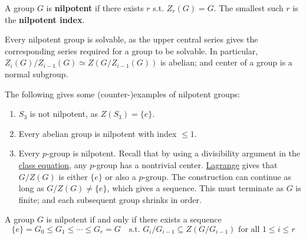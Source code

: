 \documentclass{article}
\begin{document}
\begin{definition}[Nilpotent]
    A group $G$ is \textbf{nilpotent} if there exists $r$ s.t. $Z_r(G) = G$. The smallest such $r$ is the \textbf{nilpotent index}.
\end{definition}

\begin{remark}
    Every nilpotent group is solvable, as the upper central series gives the corresponding series required for a group to be solvable. In particular, $Z_i(G)/Z_{i-1}(G) \simeq Z(G/Z_{i-1}(G))$ is abelian; and center of a group is a normal subgroup.
\end{remark}

\begin{example}\label{ex: nilpotent groups}
    The following gives some (counter-)examples of nilpotent groups:
    \begin{enumerate}
        \item $S_3$ is not nilpotent, as $Z(S_3) = \{e\}$.
        \item Every abelian group is nilpotent with index $\leq 1$.
        \item Every $p$-group is nilpotent. Recall that by using a divisibility argument in the \hyperref[eq: class equation]{class equation}, any $p$-group has a nontrivial center. \hyperref[thm: Lagrange]{Lagrange} gives that $G/Z(G)$ is either $\{e\}$ or also a $p$-group. The construction can continue as long as $G/Z(G) \neq \{e\}$, which gives a sequence. This must terminate as $G$ is finite; and each subsequent group shrinks in order.
    \end{enumerate}
\end{example}

\begin{proposition}
    A group $G$ is nilpotent if and only if there exists a sequence
    \[
        \{e\} = G_0 \leq G_1 \leq \cdots \leq G_r = G \quad \text{s.t. $G_i/G_{i-1} \subseteq Z(G/G_{i-1})$ for all $1 \leq i \leq r$}
    \]
\end{proposition}
\end{document}
